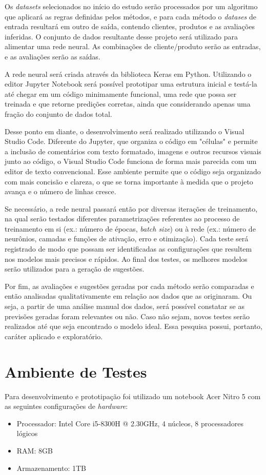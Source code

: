 Os \textit{datasets} selecionados no início do estudo serão processados por um algoritmo que aplicará as regras definidas pelos métodos, e para cada método o \textit{datases} de entrada resultará em outro de saída, contendo clientes, produtos e as avaliações inferidas. O conjunto de dados resultante desse projeto será utilizado para alimentar uma rede neural. As combinações de cliente/produto serão as entradas, e as avaliações serão as saídas. 

A rede neural será criada através da biblioteca Keras em Python. Utilizando o editor Jupyter Notebook será possível prototipar uma estrutura inicial e testá-la até chegar em um código minimamente funcional, uma rede que possa ser treinada e que retorne predições corretas, ainda que considerando apenas uma fração do conjunto de dados total. 

Desse ponto em diante, o desenvolvimento será realizado utilizando o Visual Studio Code. Diferente do Jupyter, que organiza o código em "células" e permite a inclusão de comentários com texto formatado, imagens e outros recursos visuais junto ao código, o Visual Studio Code funciona de forma mais parecida com um editor de texto convencional. Esse ambiente permite que o código seja organizado com mais concisão e clareza, o que se torna importante à medida que o projeto avança e o número de linhas cresce.

Se necessário, a rede neural passará então por diversas iterações de treinamento, na qual serão testados diferentes parametrizações referentes ao processo de treinamento em si (ex.: número de épocas, \textit{batch size}) ou à rede (ex.: número de neurônios, camadas e funções de ativação, erro e otimização). Cada teste será registrado de modo que possam ser identificadas as configurações que resultem nos modelos mais precisos e rápidos. Ao final dos testes, os melhores modelos serão utilizados para a geração de sugestões.

Por fim, as avaliações e sugestões geradas por cada método serão comparadas e então analisadas qualitativamente em relação aos dados que as originaram. Ou seja, a partir de uma análise manual dos dados, será possível constatar se as previsões geradas foram relevantes ou não. Caso não sejam, novos testes serão realizados até que seja encontrado o modelo ideal. Essa pesquisa possui, portanto, caráter aplicado e exploratório.

\section{Ambiente de Testes} \label{amb-testes}
Para desenvolvimento e prototipação foi utilizado um notebook Acer Nitro 5 com as seguintes configurações de \textit{hardware}:
\begin{itemize}
    \item Processador: Intel Core i5-8300H @ 2.30GHz, 4 núcleos, 8 processadores lógicos
    \item RAM: 8GB
    \item Armazenamento: 1TB
\end{itemize}

